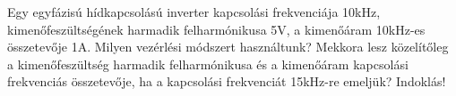 \begin{example}

Egy egyfázisú hídkapcsolású inverter kapcsolási frekvenciája 10kHz, kimenőfeszültségének harmadik felharmónikusa 5V, a kimenőáram 10kHz-es összetevője 1A. Milyen vezérlési módszert használtunk? Mekkora lesz közelítőleg a kimenőfeszültség harmadik felharmónikusa és a kimenőáram kapcsolási frekvenciás összetevője, ha a kapcsolási frekvenciát 15kHz-re emeljük? Indoklás!

\tcbline
\vspace{1mm}

\solution

\end{example}